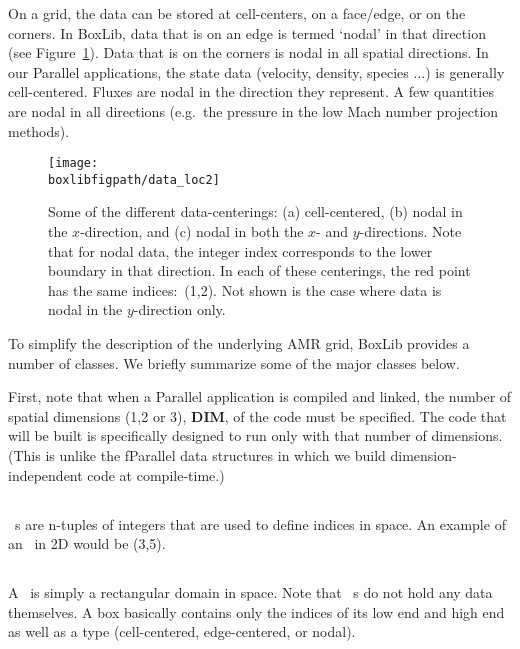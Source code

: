 On a grid, the data can be stored at cell-centers, on a face/edge, or
on the corners.  In BoxLib, data that is on an edge is termed `nodal'
in that direction (see Figure~\ref{fig:dataloc}).  Data that is on the
corners is nodal in all spatial directions.  In our Parallel applications, 
the state data (velocity, density, species $\ldots$) is generally
cell-centered.  Fluxes are nodal in the direction they represent.
A few quantities are nodal in all directions (e.g.\ the pressure in
the low Mach number projection methods).

\begin{figure}[h]
\centering
\texttt{[image: \\boxlibfigpath/data\_loc2]}
\caption[Data-centerings on the grid]
  {\label{fig:dataloc} Some of the different data-centerings:
  (a) cell-centered, (b) nodal in the $x$-direction, and (c) nodal in
  both the $x$- and $y$-directions.  Note that for nodal data, the
  integer index corresponds to the lower boundary in that direction.
  In each of these centerings, the red point has the same indices:\ (1,2).
  Not shown is the case where data is nodal in the $y$-direction only.}
\end{figure}

To simplify the description of the underlying AMR grid, BoxLib
provides a number of classes.  We briefly summarize some of the major
classes below.

First, note that when a Parallel application is compiled and linked,
the number of spatial dimensions (1,2 or 3), {\bf DIM},
 of the code must be specified.  The code that will be
built is specifically designed to run only with that number of dimensions.
(This is unlike the fParallel data structures in which we build
dimension-independent code at compile-time.)

\subsection{\IVtype}

\IVtype\ s are n-tuples of integers that are used to define
indices in space.    An example of an \IVtype\ in 2D would
be (3,5).

\subsection{\Boxtype}

A \Boxtype\ is simply a rectangular domain in space.  Note that \Boxtype\ s
do not hold any data themselves. A box basically contains
only the indices of its low end and high end as well as a type 
(cell-centered, edge-centered, or nodal).

